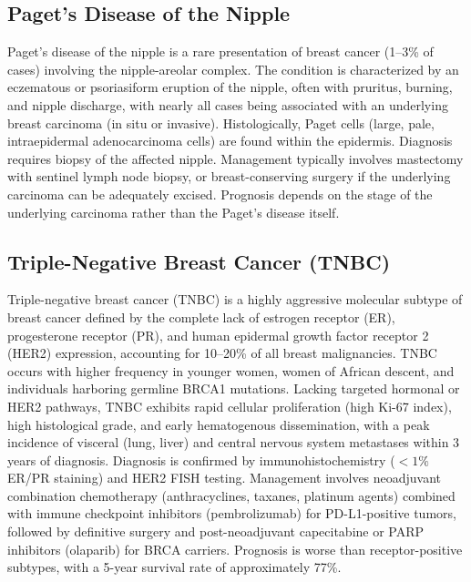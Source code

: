 \subsection{Paget's Disease of the Nipple}
\label{sec:Paget's Disease of the Nipple}
Paget's disease of the nipple is a rare presentation of breast cancer (1--3\% of cases) involving the nipple-areolar complex. The condition is characterized by an eczematous or psoriasiform eruption of the nipple, often with pruritus, burning, and nipple discharge, with nearly all cases being associated with an underlying breast carcinoma (in situ or invasive). Histologically, Paget cells (large, pale, intraepidermal adenocarcinoma cells) are found within the epidermis. Diagnosis requires biopsy of the affected nipple. Management typically involves mastectomy with sentinel lymph node biopsy, or breast-conserving surgery if the underlying carcinoma can be adequately excised. Prognosis depends on the stage of the underlying carcinoma rather than the Paget's disease itself.

\subsection{Triple-Negative Breast Cancer (TNBC)}
\label{sec:Triple-Negative Breast Cancer (TNBC)}
Triple-negative breast cancer (TNBC) is a highly aggressive molecular subtype of breast cancer defined by the complete lack of estrogen receptor (ER), progesterone receptor (PR), and human epidermal growth factor receptor 2 (HER2) expression, accounting for 10--20\% of all breast malignancies. TNBC occurs with higher frequency in younger women, women of African descent, and individuals harboring germline BRCA1 mutations. Lacking targeted hormonal or HER2 pathways, TNBC exhibits rapid cellular proliferation (high Ki-67 index), high histological grade, and early hematogenous dissemination, with a peak incidence of visceral (lung, liver) and central nervous system metastases within 3 years of diagnosis. Diagnosis is confirmed by immunohistochemistry ($<1\%$ ER/PR staining) and HER2 FISH testing. Management involves neoadjuvant combination chemotherapy (anthracyclines, taxanes, platinum agents) combined with immune checkpoint inhibitors (pembrolizumab) for PD-L1-positive tumors, followed by definitive surgery and post-neoadjuvant capecitabine or PARP inhibitors (olaparib) for BRCA carriers. Prognosis is worse than receptor-positive subtypes, with a 5-year survival rate of approximately 77\%.

